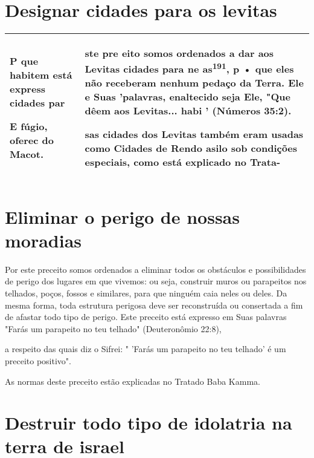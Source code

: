 \begin{itemize}
\begin{enumrate}
\begin{itemize}
\begin{itemize}
\begin{itemize}
\section{Designar cidades para os  levitas}



\begin{longtable}[]{@{}ll@{}}
\toprule
\endhead
\begin{minipage}[t]{0.47\columnwidth}\raggedright

P que habitem está express cidades par

E fúgio, oferec do Macot.
\strut
\end{minipage} & \begin{minipage}[t]{0.47\columnwidth}\raggedright

ste pre eito somos ordenados a dar aos Levitas cidades para ne
as\textsuperscript{191}, p • que eles não receberam nenhum pedaço da
Terra. Ele e Suas 'palavras, enaltecido seja Ele, "Que dêem aos
Levitas... habi ' (Números 35:2).

sas cidades dos Levitas também eram usadas como Cidades de Re­ndo asilo
sob condições especiais, como está explicado no Trata-
\strut
\end{minipage}\tabularnewline
\bottomrule
\end{longtable}

\section{Eliminar o perigo de nossas moradias}


Por este preceito somos ordenados a eliminar todos os obstáculos e
possibilidades de perigo dos lugares em que vivemos: ou seja, construir
mu­ros ou parapeitos nos telhados, poços, fossos e similares, para que
ninguém caia neles ou deles. Da mesma forma, toda estrutura perigosa
deve ser reconstruída ou consertada a fim de afastar todo tipo de
perigo. Este preceito está expresso em Suas palavras "Farás um parapeito
no teu telhado" (Deuteronômio 22:8),



a respeito das quais diz o Sifrei: " 'Farás um parapeito no teu telhado'
é um preceito positivo".


As normas deste preceito estão explicadas no Tratado Baba Kamma.


\section{Destruir todo tipo de idolatria na terra de israel}


\end{itemize}
\end{itemize}
\end{itemize}
\end{enumrate}
\end{itemize}
